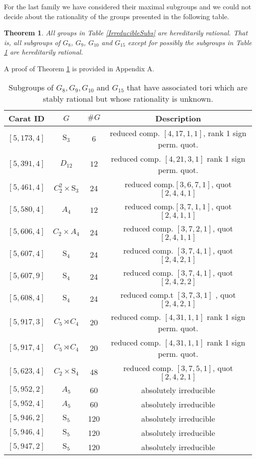 \documentclass[a4paper, 14pt]{extarticle}
\theoremstyle{plain}
\newtheorem{theorem}{Theorem}
\theoremstyle{definition}
\begin{document}
\noindent
For the last family we have considered their maximal subgroups and we could not decide about the rationality of the groups presented in the following table.
\begin{theorem}\label{SubG8}
All groups in Table \ref{IrreducibleSubs} are hereditarily rational. That is, all subgroups of $G_8$, $G_9$, $G_{10}$ and $G_{15}$ except for possibly the subgroups in Table \ref{SubIrreducible} are hereditarily rational.
\end{theorem}
\noindent
A proof of Theorem \ref{SubG8} is provided in Appendix A.
\begin{center} 
\begin{table} [H]
\begin{tabular}{cccc}
 Carat ID  & $G$ & $\#G$ & Description\\
\hline
 $[5,173,4]$ & $\mathrm{S}_3$ & 6 &  reduced comp. $[ 4, 17, 1, 1 ]$,  rank 1 sign perm. quot. \\
 $[5,391,4]$ &$D_{12}$ & $12$ &  reduced comp. $ [ 4, 21, 3, 1 ]$  rank 1 sign perm. quot. \\
 $[5,461,4]$ &$C^2_2 \times \mathrm{S}_3$ & 24 & reduced comp.$[3,6,7,1]$, quot $[2,4,4,1]$  \\
 $[5,580,4]$ & $A_4$ & $12$ &  reduced comp.$[3,7,1,1]$, quot $[ 2, 4, 1, 1 ]$\\
 $[5,606,4]$ & $C_2 \times A_4$ & 24 &reduced comp. $[3,7,2,1]$, quot $[ 2, 4, 1, 1 ]$ \\
 $[5,607,4]$ & $\mathrm{S}_4$ & 24 &reduced comp. $[3,7,4,1]$, quot $[ 2, 4, 2, 1 ]$ \\
 $[5,607,9]$ &$\mathrm{S}_4$ & 24 & reduced comp. $ [ 3, 7, 4, 1 ]$, quot $[ 2, 4, 2, 2 ]$ \\
 $[5,608,4]$ &$\mathrm{S}_4$ & 24 & reduced comp.t $[ 3, 7, 3, 1 ]$ , quot $[ 2, 4, 2, 1 ]$ \\
 $[5,917,3]$ &$C_5 \rtimes C_4$ & 20 &  reduced comp.  $[ 4, 31, 1, 1 ]$  rank 1 sign perm. quot. \\
 $[5,917,4]$ &$C_5 \rtimes C_4$ & 20 &  reduced comp.  $[ 4, 31, 1, 1 ]$   rank 1 sign perm. quot. \\
 $[5,623,4]$ &$C_2 \times \mathrm{S}_4$ & 48 & reduced comp. $[3,7,5,1]$, quot $[ 2, 4, 2, 1 ]$ \\
 $[5,952,2]$ &$A_5$ & 60 & absolutely irreducible \\
 $[5,952,4]$ &$A_5$ & 60 & absolutely irreducible \\
 $[5,946,2]$ &$\mathrm{S}_5$ & 120 & absolutely irreducible \\
 $[5,946,4]$ &$\mathrm{S}_5$ & 120 & absolutely irreducible \\
 $[5,947,2]$ &$\mathrm{S}_5$ & 120 & absolutely irreducible 
\end{tabular}
\caption{Subgroups of $G_8, G_9, G_{10}$ and $G_{15}$ that have associated tori which are stably rational but whose rationality is unknown.}
\label{SubIrreducible}
\end{table}
\end{center}
\end{document}
